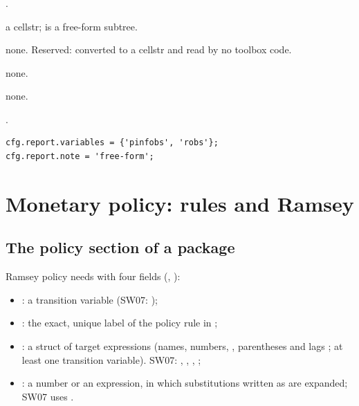 \documentclass[11pt,a4paper]{article}
\DeclareRobustCommand{\codem}[1]{\texttt{\detokenize{#1}}}
\newenvironment{optspec}%
  {\begin{description}[style=sameline,leftmargin=2.7cm,labelwidth=2.5cm,font=\normalfont\itshape]}%
  {\end{description}}
\begin{document}
\subsubsection{\texorpdfstring{\codem{report.variables}}{report.variables}}\label{opt:report-variables}
\begin{optspec}
  \item[Default] \code{{}}.
  \item[Values] a cellstr;  is a free-form subtree.
  \item[Math] none. Reserved: converted to a cellstr and read by no toolbox code.
  \item[Assumptions] none.
  \item[Interactions] none.
  \item[Code] .
  \item[Example]
\begin{lstlisting}
cfg.report.variables = {'pinfobs', 'robs'};
cfg.report.note = 'free-form';
\end{lstlisting}
\end{optspec}

\section{Monetary policy: rules and Ramsey}\label{sec:policy}

\subsection{The policy section of a package}\label{sec:specpolicy}

Ramsey policy needs  with four fields (,
):

\begin{itemize}[nosep]
  \item {}: a transition variable (SW07: );
  \item {}: the exact, unique label of the policy rule in
        ;
  \item {}: a struct of target expressions (names, numbers, \code{+ - * / ^},
        parentheses and lags ; at least one transition variable). SW07:
        , , , ;
  \item {}: a number or an expression, in which substitutions written as
         are expanded; SW07 uses .
\end{itemize}
\end{document}
